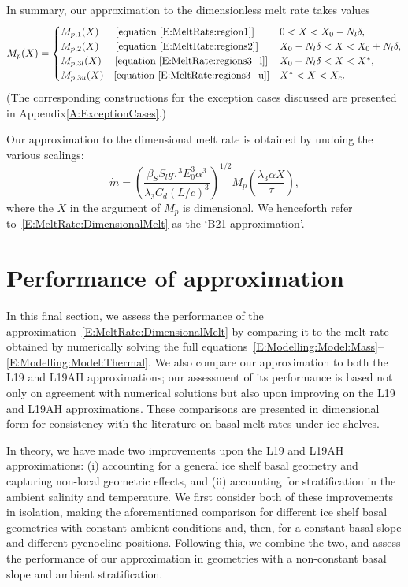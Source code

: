 \documentclass[openacc]{rsproca_new}%
\newcommand{\lt}{\delta} %
\begin{document}
In summary, our approximation to the dimensionless melt rate takes values
\begin{equation}\label{E:MeltRate:AllRegions}
M_{p}(X) = \begin{cases} 
M_{p,1}(X) \text{~~\quad [equation~\eqref{E:MeltRate:region1}]}  & 0 < X < X_0 - N_l \lt,\\
M_{p,2}(X) \text{~~\quad [equation~\eqref{E:MeltRate:regions2}]} & X_0 - N_l \lt < X < X_0 + N_l \lt,\\
M_{p,3l}(X) \text{~\quad [equation~\eqref{E:MeltRate:regions3_l}]} & X_0 + N_l \lt < X < X^*,\\
M_{p,3u}(X) \text{\quad [equation~\eqref{E:MeltRate:regions3_u}]} & X^* < X < X_c.
\end{cases}
\end{equation}
(The corresponding constructions for the exception cases discussed are presented in Appendix\ref{A:ExceptionCases}.)

Our approximation to the dimensional melt rate is obtained by undoing the various scalings:
\begin{equation}\label{E:MeltRate:DimensionalMelt}
\dot{m} =\left(\frac{\beta_S S_l g \tau^3 E_0^3 \alpha^3}{\lambda_3 C_d (L/c)^3}\right)^{1/2} M_p\left(\frac{\lambda_3 \alpha X}{\tau}\right),
\end{equation}
where the $X$ in the argument of $M_p$ is dimensional. We henceforth refer to~\eqref{E:MeltRate:DimensionalMelt} as the `B21 approximation'.


\section{Performance of approximation}\label{S:Numerics}
In this final section, we assess the performance of the approximation~\eqref{E:MeltRate:DimensionalMelt} by comparing it to the melt rate obtained by  numerically solving the full equations~\eqref{E:Modelling:Model:Mass}--\eqref{E:Modelling:Model:Thermal}. We also compare our approximation to both the L19 and L19AH approximations; our assessment of its performance is based not only on agreement with numerical solutions but also upon improving on the L19 and L19AH approximations. These comparisons are presented in dimensional form for consistency with the literature on basal melt rates under ice shelves.

In theory, we have made two improvements upon the L19 and L19AH approximations: (i) accounting for a general ice shelf basal geometry and capturing non-local geometric effects, and (ii) accounting for stratification in the ambient salinity and temperature. We first consider both of these improvements in isolation, making the aforementioned comparison for different ice shelf basal geometries with constant ambient conditions and, then, for a constant basal slope and different pycnocline positions. Following this, we combine the two, and assess the performance of our approximation in geometries with a non-constant basal slope and ambient stratification.
\end{document}

